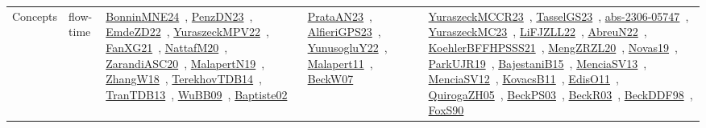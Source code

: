 {\begin{longtable}{lp{3cm}>{\raggedright\arraybackslash}p{6cm}>{\raggedright\arraybackslash}p{6cm}>{\raggedright\arraybackslash}p{8cm}}
Concepts & flow-time & \href{../works/BonninMNE24.pdf}{BonninMNE24}~\cite{BonninMNE24}, \href{../works/PenzDN23.pdf}{PenzDN23}~\cite{PenzDN23}, \href{../works/EmdeZD22.pdf}{EmdeZD22}~\cite{EmdeZD22}, \href{../works/YuraszeckMPV22.pdf}{YuraszeckMPV22}~\cite{YuraszeckMPV22}, \href{../works/FanXG21.pdf}{FanXG21}~\cite{FanXG21}, \href{../works/NattafM20.pdf}{NattafM20}~\cite{NattafM20}, \href{../works/ZarandiASC20.pdf}{ZarandiASC20}~\cite{ZarandiASC20}, \href{../works/MalapertN19.pdf}{MalapertN19}~\cite{MalapertN19}, \href{../works/ZhangW18.pdf}{ZhangW18}~\cite{ZhangW18}, \href{../works/TerekhovTDB14.pdf}{TerekhovTDB14}~\cite{TerekhovTDB14}, \href{../works/TranTDB13.pdf}{TranTDB13}~\cite{TranTDB13}, \href{../works/WuBB09.pdf}{WuBB09}~\cite{WuBB09}, \href{../works/Baptiste02.pdf}{Baptiste02}~\cite{Baptiste02} & \href{../works/PrataAN23.pdf}{PrataAN23}~\cite{PrataAN23}, \href{../works/AlfieriGPS23.pdf}{AlfieriGPS23}~\cite{AlfieriGPS23}, \href{../works/YunusogluY22.pdf}{YunusogluY22}~\cite{YunusogluY22}, \href{../works/Malapert11.pdf}{Malapert11}~\cite{Malapert11}, \href{../works/BeckW07.pdf}{BeckW07}~\cite{BeckW07} & \href{../works/YuraszeckMCCR23.pdf}{YuraszeckMCCR23}~\cite{YuraszeckMCCR23}, \href{../works/TasselGS23.pdf}{TasselGS23}~\cite{TasselGS23}, \href{../works/abs-2306-05747.pdf}{abs-2306-05747}~\cite{abs-2306-05747}, \href{../works/YuraszeckMC23.pdf}{YuraszeckMC23}~\cite{YuraszeckMC23}, \href{../works/LiFJZLL22.pdf}{LiFJZLL22}~\cite{LiFJZLL22}, \href{../works/AbreuN22.pdf}{AbreuN22}~\cite{AbreuN22}, \href{../works/KoehlerBFFHPSSS21.pdf}{KoehlerBFFHPSSS21}~\cite{KoehlerBFFHPSSS21}, \href{../works/MengZRZL20.pdf}{MengZRZL20}~\cite{MengZRZL20}, \href{../works/Novas19.pdf}{Novas19}~\cite{Novas19}, \href{../works/ParkUJR19.pdf}{ParkUJR19}~\cite{ParkUJR19}, \href{../works/BajestaniB15.pdf}{BajestaniB15}~\cite{BajestaniB15}, \href{../works/MenciaSV13.pdf}{MenciaSV13}~\cite{MenciaSV13}, \href{../works/MenciaSV12.pdf}{MenciaSV12}~\cite{MenciaSV12}, \href{../works/KovacsB11.pdf}{KovacsB11}~\cite{KovacsB11}, \href{../works/EdisO11.pdf}{EdisO11}~\cite{EdisO11}, \href{../works/QuirogaZH05.pdf}{QuirogaZH05}~\cite{QuirogaZH05}, \href{../works/BeckPS03.pdf}{BeckPS03}~\cite{BeckPS03}, \href{../works/BeckR03.pdf}{BeckR03}~\cite{BeckR03}, \href{../works/BeckDDF98.pdf}{BeckDDF98}~\cite{BeckDDF98}, \href{../works/FoxS90.pdf}{FoxS90}~\cite{FoxS90}\\

\end{longtable}}
